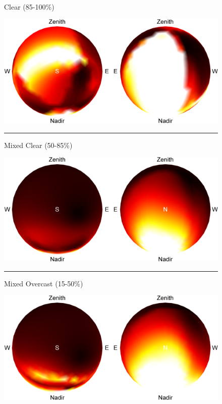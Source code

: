 \begin{figure}[t]
    \centering
    \begin{sideways}\begin{minipage}{.25\linewidth}\centering \scriptsize Clear (85-100\%)\vspace{5pt} \end{minipage}\end{sideways}
    \includegraphics[width=.5\linewidth]{./figures/confidenceIntervals/clear-mean_10pm.png} \\
    \vspace{-.8em} \noindent\rule{\linewidth}{0.1pt}
    \begin{sideways}\begin{minipage}{.25\linewidth}\centering \scriptsize Mixed Clear (50-85\%)\vspace{5pt} \end{minipage}\end{sideways}
    \includegraphics[width=.5\linewidth]{./figures/confidenceIntervals/mixed-clear-mean_10pm.png} \\
    \vspace{-.8em} \noindent\rule{\linewidth}{0.1pt}
    \begin{sideways}\begin{minipage}{.25\linewidth}\centering \scriptsize Mixed Overcast (15-50\%)\vspace{5pt} \end{minipage}\end{sideways}
    \includegraphics[width=.5\linewidth]{./figures/confidenceIntervals/mixed-overcast-mean_10pm.png} \\

\end{figure}
